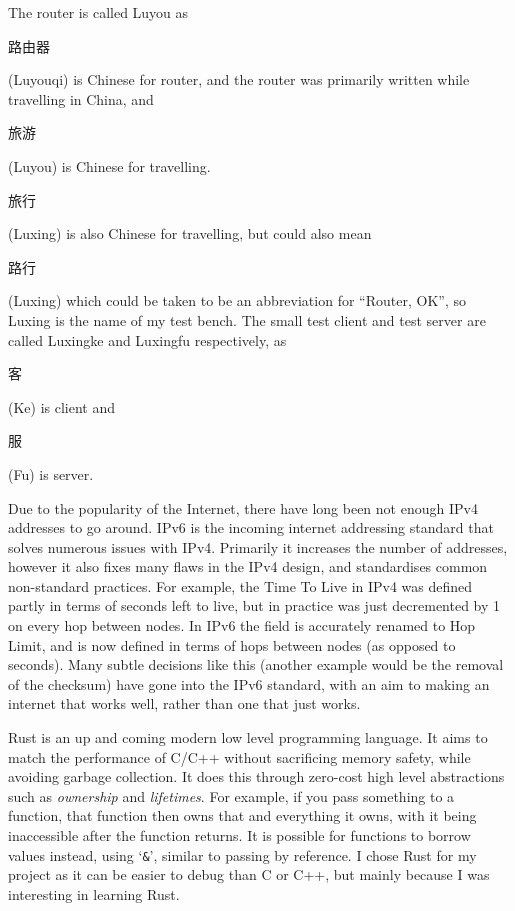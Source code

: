 \documentclass[12pt,a4paper,twoside,openright]{report}
\begin{document}
\bigskip

The router is called Luyou as \begin{CJK}{UTF8}{gbsn}路由器\end{CJK} (Luyouqi) is Chinese for router, and the router was primarily written while travelling in China, and \begin{CJK}{UTF8}{gbsn}旅游\end{CJK} (Luyou) is Chinese for travelling. \begin{CJK}{UTF8}{gbsn}旅行\end{CJK} (Luxing) is also Chinese for travelling, but could also mean \begin{CJK}{UTF8}{gbsn}路行\end{CJK} (Luxing) which could be taken to be an abbreviation for ``Router, OK'', so Luxing is the name of my test bench. The small test client and test server are called Luxingke and Luxingfu respectively, as \begin{CJK}{UTF8}{gbsn}客\end{CJK} (Ke) is client and \begin{CJK}{UTF8}{gbsn}服\end{CJK} (Fu) is server.

\bigskip

Due to the popularity of the Internet, there have long been not enough IPv4\cite{ipv4_rfc} addresses to go around. IPv6 is the incoming internet addressing standard that solves numerous issues with IPv4.  Primarily it increases the number of addresses, however it also fixes many flaws in the IPv4 design, and standardises common non-standard practices. For example, the Time To Live in IPv4 was defined partly in terms of seconds left to live, but in practice was just decremented by 1 on every hop between nodes. In IPv6 the field is accurately renamed to Hop Limit, and is now defined in terms of hops between nodes (as opposed to seconds). Many subtle decisions like this (another example would be the removal of the checksum) have gone into the IPv6 standard, with an aim to making an internet that works well, rather than one that just works.

\bigskip

Rust\cite{rust} is an up and coming modern low level programming language. It aims to match the performance of C/C++ without sacrificing memory safety, while avoiding garbage collection. It does this through zero-cost high level abstractions such as \textit{ownership} and \textit{lifetimes}. For example, if you pass something to a function, that function then owns that and everything it owns, with it being inaccessible after the function returns. It is possible for functions to borrow values instead, using `\verb!&!', similar to passing by reference.  I chose Rust for my project as it can be easier to debug than C or C++, but mainly because I was interesting in learning Rust.
\end{document}
